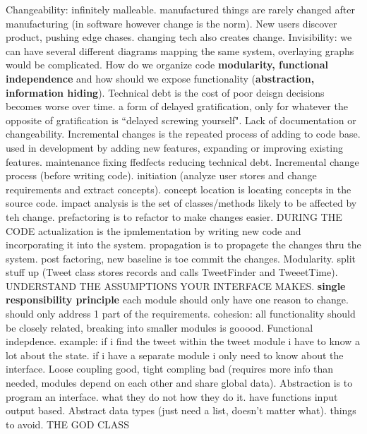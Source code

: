 \documentclass[10pt]{article}
\begin{document}
\begin{landscape}
\begin{multicols*}{6}
Changeability: infinitely malleable. manufactured things are rarely changed after manufacturing (in software however change is the norm). New users discover product, pushing edge chases. changing tech also creates change.
Invisibility: we can have several different diagrams mapping the same system, overlaying graphs would be complicated.
How do we organize code \textbf{modularity, functional independence} and how should we expose functionality (\textbf{abstraction, information hiding}).
Technical debt is the cost of poor deisgn decisions becomes worse over time. a form of delayed gratification, only for whatever the opposite of gratification is ``delayed screwing yourself". Lack of documentation or changeability.
Incremental changes is the repeated process of adding to code base. used in development by adding new features, expanding or improving existing features. maintenance fixing ffedfects reducing technical debt.
Incremental change process (before writing code). initiation (analyze user stores and change requirements and extract concepts). concept location is locating concepts in the source code. impact analysis is the set of classes/methods likely to be affected by teh change. prefactoring is to refactor to make changes easier. DURING THE CODE actualization is the ipmlementation by writing new code and incorporating it into the system. propagation is to propagete the changes thru the system. post factoring, new baseline is toe commit the changes.
Modularity. split stuff up (Tweet class stores records and calls TweetFinder and TweeetTime). UNDERSTAND THE ASSUMPTIONS YOUR INTERFACE MAKES. \textbf{single responsibility principle} each module should only have one reason to change. should only address 1 part of the requirements. cohesion: all functionality should be closely related, breaking into smaller modules is gooood.
Functional indepdence. example: if i find the tweet within the tweet module i have to know a lot about the state. if i have a separate module i only need to know about the interface. Loose coupling good, tight compling bad (requires more info than needed, modules depend on each other and share global data).
Abstraction is to program an interface. what they do not how they do it. have functions input output based. Abstract data types (just need a list, doesn't matter what). things to avoid. THE GOD CLASS

\end{multicols*}
\end{landscape}
\end{document}
